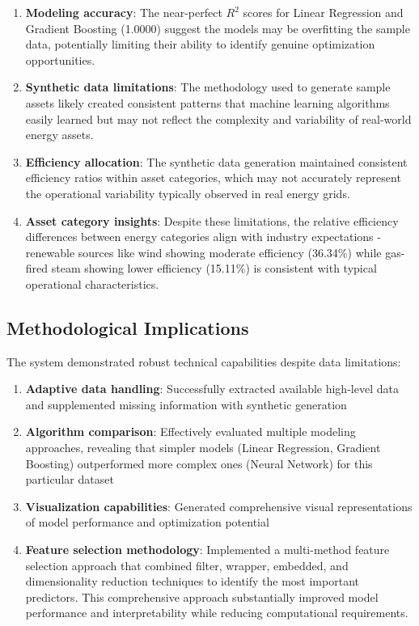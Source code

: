 \documentclass[12pt,a4paper]{article}
\begin{document}
\begin{enumerate}
    \item \textbf{Modeling accuracy}: The near-perfect $R^2$ scores for Linear Regression and Gradient Boosting (1.0000) suggest the models may be overfitting the sample data, potentially limiting their ability to identify genuine optimization opportunities.

    \item \textbf{Synthetic data limitations}: The methodology used to generate sample assets likely created consistent patterns that machine learning algorithms easily learned but may not reflect the complexity and variability of real-world energy assets.

    \item \textbf{Efficiency allocation}: The synthetic data generation maintained consistent efficiency ratios within asset categories, which may not accurately represent the operational variability typically observed in real energy grids.

    \item \textbf{Asset category insights}: Despite these limitations, the relative efficiency differences between energy categories align with industry expectations - renewable sources like wind showing moderate efficiency (36.34\%) while gas-fired steam showing lower efficiency (15.11\%) is consistent with typical operational characteristics.
\end{enumerate}

\subsection{Methodological Implications}

The system demonstrated robust technical capabilities despite data limitations:

\begin{enumerate}
    \item \textbf{Adaptive data handling}: Successfully extracted available high-level data and supplemented missing information with synthetic generation
    \item \textbf{Algorithm comparison}: Effectively evaluated multiple modeling approaches, revealing that simpler models (Linear Regression, Gradient Boosting) outperformed more complex ones (Neural Network) for this particular dataset
    \item \textbf{Visualization capabilities}: Generated comprehensive visual representations of model performance and optimization potential
    \item \textbf{Feature selection methodology}: Implemented a multi-method feature selection approach that combined filter, wrapper, embedded, and dimensionality reduction techniques to identify the most important predictors. This comprehensive approach substantially improved model performance and interpretability while reducing computational requirements.
\end{enumerate}
\end{document}
